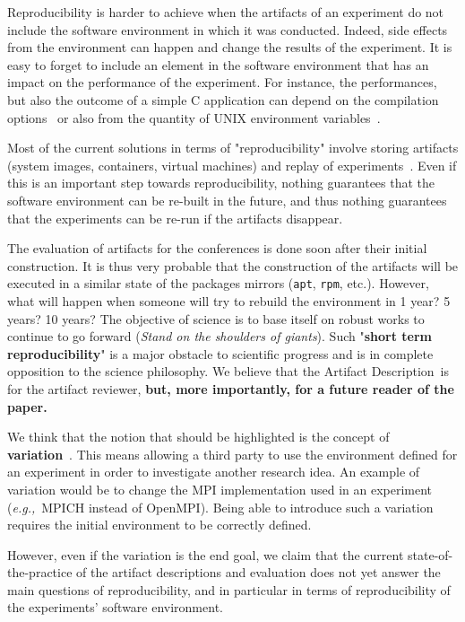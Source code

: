 \documentclass[sigconf,natbib=false]{acmart}
\newcommand{\repro}{reproducibility}
\newcommand{\eg}{\emph{e.g.,}}
\newcommand{\ad}{Artifact Description}
\begin{document}
Reproducibility is harder to achieve when the artifacts of an experiment do not include the software environment in which it was conducted.
Indeed, side effects from the environment can happen and change the results of the experiment.
It is easy to forget to include an element in the software environment that has an impact on the performance of the experiment.
For instance, the performances, but also the outcome of a simple C application can depend on the compilation options\ \cite{stodden2018assessing} or also from the quantity of UNIX environment variables\ \cite{mytkowicz2009producing}.

Most of the current solutions in terms of "\repro" involve storing artifacts (system images, containers, virtual machines) and replay of experiments\ \cite{rosendo2020e2clab, brammer2011paper, brinckman2019computing}.
Even if this is an important step towards \repro, nothing guarantees that the software environment can be re-built in the future, and thus nothing guarantees that the experiments can be re-run if the artifacts disappear. 


The evaluation of artifacts for the conferences is done soon after their initial construction.
It is thus very probable that the construction of the artifacts will be executed in a similar state of the packages mirrors (\texttt{apt}, \texttt{rpm}, etc.).
However, what will happen when someone will try to rebuild the environment in 1 year? 5 years? 10 years?
The objective of science is to base itself on robust works to continue to go forward (\emph{Stand on the shoulders of giants}).
Such "\textbf{short term reproducibility}" is a major obstacle to scientific progress and is in complete opposition to the science philosophy.
We believe that the \ad\ is for the artifact reviewer, \textbf{but, more importantly, for a future reader of the paper.}


We think that the notion that should be highlighted is the concept of \textbf{variation}\ \cite{mercier2018considering, feitelson_repeatability_2015}.
This means allowing a third party to use the environment defined for an experiment in order to investigate another research idea.
An example of variation would be to change the MPI implementation used in an experiment (\eg\ MPICH instead of OpenMPI).
Being able to introduce such a variation requires the initial environment to be correctly defined.

However, even if the variation is the end goal, we claim that the current state-of-the-practice of the artifact descriptions and evaluation does not yet answer the main questions of reproducibility, and in particular in terms of reproducibility of the experiments' software environment.
\end{document}
